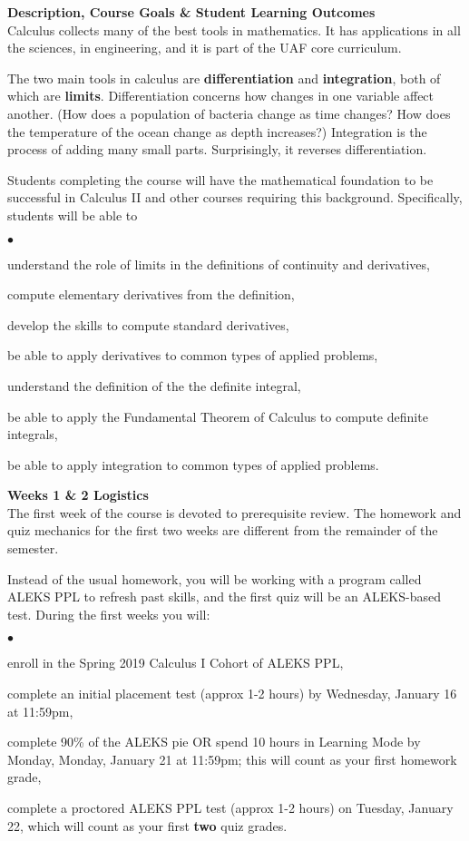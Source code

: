 \documentclass[12pt]{article}
\renewcommand{\emph}[1]{\textsf{\textbf{#1}}}
\newcommand{\localhead}[1]{\par\smallskip\textbf{#1}\nobreak\\}%
\def\heading#1{\localhead{\large\emph{#1}}}
\newenvironment{clist}%
{\bgroup\parskip 0pt\begin{list}{$\bullet$}{\partopsep 4pt\topsep 0pt\itemsep -2pt}}%
{\end{list}\egroup}%
\begin{document}
\heading{Description, Course Goals \& Student Learning Outcomes}
Calculus collects many of the best tools in mathematics.  It has applications in all the sciences, in engineering, and it is part of the UAF core curriculum.

The two main tools in calculus are \emph{differentiation} and \emph{integration}, both of which are \emph{limits}.  Differentiation concerns how changes in one variable affect another.  (How does a population of bacteria change as time changes?  How does the temperature of the ocean change as depth increases?)  Integration is the process of adding many small parts.  Surprisingly, it reverses differentiation.

Students completing the course will have the mathematical foundation to be successful in Calculus II and other courses
requiring this background.  Specifically, students will be able to

\begin{clist}
\item understand the role of limits in the definitions of continuity and derivatives,
\item compute elementary derivatives from the definition,
\item develop the skills to compute standard derivatives,
\item be able to apply derivatives to common types of applied problems,
\item understand the definition of the the definite integral,
\item be able to apply the Fundamental Theorem of Calculus to
compute definite integrals,
\item be able to apply integration to common types of applied problems.
\end{clist}

\heading{Weeks 1 \& 2 Logistics}
The first week of the course is devoted to prerequisite review.  The homework and quiz mechanics for the first two weeks are different from the remainder of the semester.

Instead of the usual homework, you will be working with a program called ALEKS PPL to refresh past skills, and the first quiz will be an ALEKS-based test.  During the first weeks you will:

\begin{clist}
\item enroll in the Spring 2019 Calculus I Cohort of ALEKS PPL,
\item complete an initial placement test (approx 1-2 hours) by Wednesday, January 16 at 11:59pm,
\item complete 90\% of the ALEKS pie \: OR \: spend 10 hours in Learning Mode by Monday, Monday, January 21 at 11:59pm; this will count as your first homework grade,
\item complete a proctored ALEKS PPL test (approx 1-2 hours) on Tuesday, January 22, which will count as your first \textbf{two} quiz grades.
\end{clist}
\end{document}
